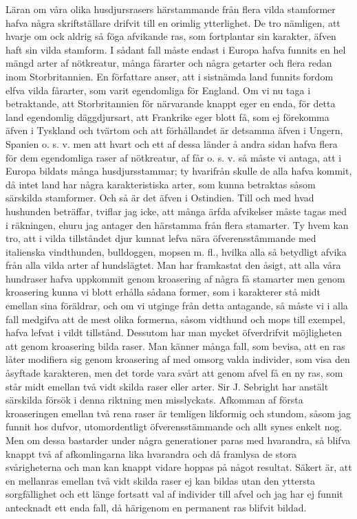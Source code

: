 Läran om våra olika husdjursrasers härstammande från flera vilda stamformer hafva några skriftställare drifvit till en orimlig ytterlighet. De tro nämligen, att hvarje om ock aldrig så föga afvikande ras, som fortplantar sin karakter, äfven haft sin vilda stamform. I sådant fall måste endast i Europa hafva funnits en hel mängd arter af nötkreatur, många fårarter och några getarter och flera redan inom Storbritannien. En författare anser, att i sistnämda land funnits fordom elfva vilda fårarter, som varit egendomliga för England. Om vi nu taga i betraktande, att Storbritannien för närvarande knappt eger en enda, för detta land egendomlig däggdjursart, att Frankrike eger blott få, som ej förekomma äfven i Tyskland och tvärtom och att förhållandet är detsamma äfven i Ungern, Spanien o. s. v. men att hvart och ett af dessa länder å andra sidan hafva flera för dem egendomliga raser af nötkreatur, af får o. s. v. så måste vi antaga, att i Europa bildats många husdjursstammar; ty hvarifrån skulle de alla hafva kommit, då intet land har några karakteristiska arter, som kunna betraktas såsom särskilda stamformer. Och så är det äfven i Ostindien. Till och med hvad hushunden beträffar, tviflar jag icke, att många ärfda afvikelser måste tagas med i räkningen, ehuru jag antager den härstamma från flera stamarter. Ty hvem kan tro, att i vilda tillståndet djur kunnat lefva nära öfverensstämmande med italienska vindthunden, bulldoggen, mopsen m. fl., hvilka alla så betydligt afvika från alla vilda arter af hundslägtet. Man har framkastat den åsigt, att alla våra hundraser hafva uppkommit genom kroasering af några få stamarter men genom kroasering kunna vi blott erhålla sådana former, som i karakterer stå midt emellan sina föräldrar, och om vi utginge från detta antagande, så måste vi i alla fall medgifva att de mest olika formerna, såsom vidthund och mops till exempel, hafva lefvat i vildt tillstånd. Dessutom har man mycket öfverdrifvit möjligheten att genom kroasering bilda raser. Man känner många fall, som bevisa, att en ras låter modifiera sig genom kroasering af med omsorg valda individer, som visa den åsyftade karakteren, men det torde vara svårt att genom afvel få en ny ras, som står midt emellan två vidt skilda raser eller arter. Sir J. Sebright har anstält särskilda försök i denna riktning men misslyckats. Afkomman af första kroaseringen emellan två rena raser är temligen likformig och stundom, såsom jag funnit hos dufvor, utomordentligt öfverensstämmande och allt synes enkelt nog. Men om dessa bastarder under några generationer paras med hvarandra, så blifva knappt två af afkomlingarna lika hvarandra och då framlysa de stora svårigheterna och man kan knappt vidare hoppas på något resultat. Säkert är, att en mellanras emellan två vidt skilda raser ej kan bildas utan den yttersta sorgfällighet och ett länge fortsatt val af individer till afvel och jag har ej funnit antecknadt ett enda fall, då härigenom en permanent ras blifvit bildad.



